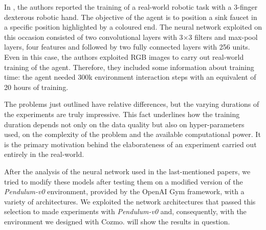 In \cite{haarnoja2018alg}, the authors reported the training of a real-world robotic task with a 3-finger dexterous robotic hand.
The objective of the agent is to position a sink faucet in a specific position highlighted by a coloured end.
The neural network exploited on this occasion consisted of two convolutional layers with 3$\times$3 filters and max-pool layers, four features and followed by two fully connected layers with 256 units.
Even in this case, the authors exploited RGB images to carry out real-world training of the agent.
Therefore, they included some information about training time: the agent needed 300k environment interaction steps with an equivalent of 20 hours of training.

The problems just outlined have relative differences, but the varying durations of the experiments are truly impressive.
This fact underlines how the training duration depends not only on the data quality but also on hyper-parameters used, on the complexity of the problem and the available computational power.
It is the primary motivation behind the elaborateness of an experiment carried out entirely in the real-world.

After the analysis of the neural network used in the last-mentioned papers, we tried to modify these models after testing them on a modified version of the \textit{Pendulum-v0} environment, provided by the OpenAI Gym framework, with a variety of architectures.
We exploited the network architectures that passed this selection to made experiments with \textit{Pendulum-v0} and, consequently, with the environment we designed with Cozmo.
 will show the results in question.

